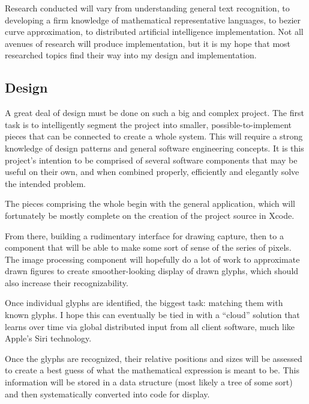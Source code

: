\documentclass{acm_proc_article-sp}
\begin{document}
Research conducted will vary from understanding general text recognition, to developing a firm knowledge of mathematical representative languages, to bezier curve approximation, to distributed artificial intelligence implementation. Not all avenues of research will produce implementation, but it is my hope that most researched topics find their way into my design and implementation.

\subsection{Design}
A great deal of design must be done on such a big and complex project. The first task is to intelligently segment the project into smaller, possible-to-implement pieces that can be connected to create a whole system. This will require a strong knowledge of design patterns and general software engineering concepts. It is this project's intention to be comprised of several software components that may be useful on their own, and when combined properly, efficiently and elegantly solve the intended problem. 

The pieces comprising the whole begin with the general application, which will fortunately be mostly complete on the creation of the project source in Xcode. 

From there, building a rudimentary interface for drawing capture, then to a component that will be able to make some sort of sense of the series of pixels. The image processing component will hopefully do a lot of work to approximate drawn figures to create smoother-looking display of drawn glyphs, which should also increase their recognizability. 

Once individual glyphs are identified, the biggest task: matching them with known glyphs. I hope this can eventually be tied in with a ``cloud'' solution that learns over time via global distributed input from all client software, much like Apple's Siri technology. 

Once the glyphs are recognized, their relative positions and sizes will  be assessed to create a best guess of what the mathematical expression is meant to be. This information will be stored in a data structure (most likely a tree of some sort) and then systematically converted into code for display.
\end{document}
